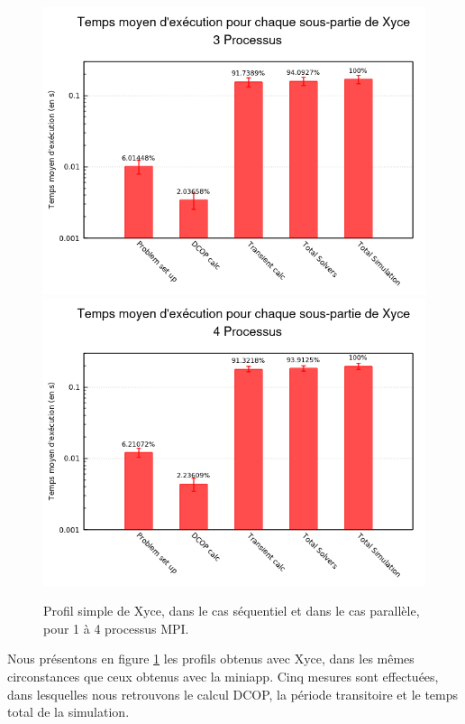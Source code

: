 \documentclass[11pt,a4paper,oneside]{memoir}
\theoremstyle{definition}
\theoremstyle{remark}
\theoremstyle{plain}
\begin{document}
\begin{figure}
\begin{center}
\includegraphics[scale=0.45]{Images-Rapport/Profil_Xyce/Profil_Xyce_parallele3.png}
\includegraphics[scale=0.45]{Images-Rapport/Profil_Xyce/Profil_Xyce_parallele4.png}
\caption{Profil simple de Xyce, dans le cas séquentiel et dans le cas parallèle, pour 1 à 4 processus MPI.}
\label{Profil_Xyce}
\end{center}
\end{figure}


Nous présentons en figure \ref{Profil_Xyce} les profils obtenus avec Xyce, dans les mêmes circonstances que ceux obtenus avec la miniapp. Cinq mesures sont effectuées, dans lesquelles nous retrouvons le calcul DCOP, la période transitoire et le temps total de la simulation.
\end{document}
